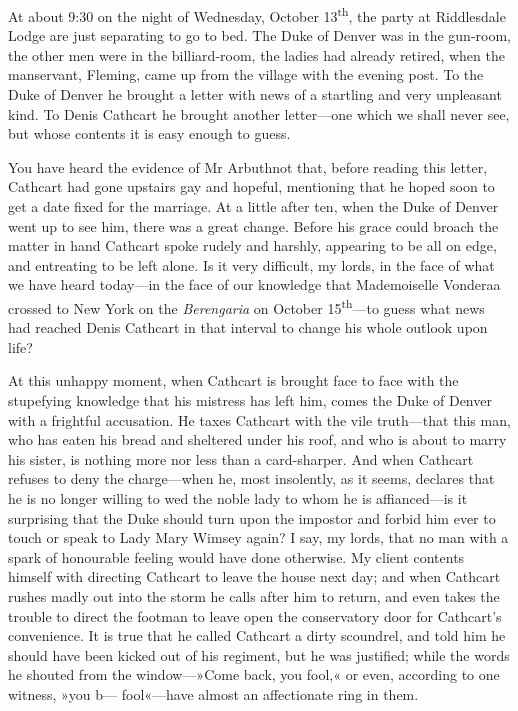 \begin{dialogue}
\smallskip 

At about 9:30 on the night of Wednesday, October 13\textsuperscript{th}, the party at Riddlesdale Lodge are just separating to go to bed. The Duke of Denver was in the gun-room, the other men were in the billiard-room, the ladies had already retired, when the manservant, Fleming, came up from the village with the evening post. To the Duke of Denver he brought a letter with news of a startling and very unpleasant kind. To Denis Cathcart he brought another letter\allowbreak---\allowbreak one which we shall never see, but whose contents it is easy enough to guess.

\smallskip 

You have heard the evidence of Mr Arbuthnot that, before reading this letter, Cathcart had gone upstairs gay and hopeful, mentioning that he hoped soon to get a date fixed for the marriage. At a little after ten, when the Duke of Denver went up to see him, there was a great change. Before his grace could broach the matter in hand Cathcart spoke rudely and harshly, appearing to be all on edge, and entreating to be left alone. Is it very difficult, my lords, in the face of what we have heard today\allowbreak---\allowbreak in the face of our knowledge that Mademoiselle Vonderaa crossed to New York on the \textit{Berengaria} on October 15\textsuperscript{th}---to guess what news had reached Denis Cathcart in that interval to change his whole outlook upon life?

\smallskip 

At this unhappy moment, when Cathcart is brought face to face with the stupefying knowledge that his mistress has left him, comes the Duke of Denver with a frightful accusation. He taxes Cathcart with the vile truth\allowbreak---\allowbreak that this man, who has eaten his bread and sheltered under his roof, and who is about to marry his sister, is nothing more nor less than a card-sharper. And when Cathcart refuses to deny the charge\allowbreak---\allowbreak when he, most insolently, as it seems, declares that he is no longer willing to wed the noble lady to whom he is affianced\allowbreak---\allowbreak is it surprising that the Duke should turn upon the impostor and forbid him ever to touch or speak to Lady Mary Wimsey again? I say, my lords, that no man with a spark of honourable feeling would have done otherwise. My client contents himself with directing Cathcart to leave the house next day; and when Cathcart rushes madly out into the storm he calls after him to return, and even takes the trouble to direct the footman to leave open the conservatory door for Cathcart's convenience. It is true that he called Cathcart a dirty scoundrel, and told him he should have been kicked out of his regiment, but he was justified; while the words he shouted from the window---»Come back, you fool,« or even, according to one witness, »you b--- fool«---have almost an affectionate ring in them. 


\end{dialogue}
